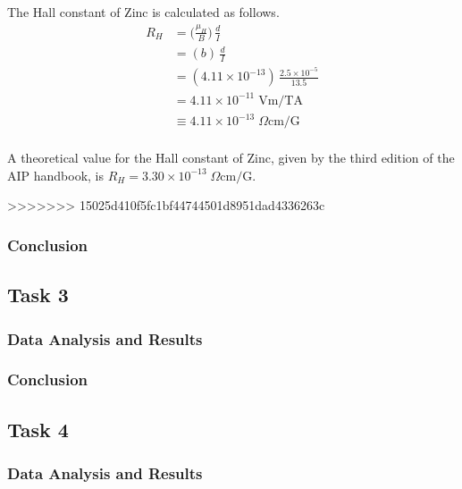 \documentclass[a4paper]{article}
\begin{document}
The Hall constant of Zinc is calculated as follows.
\begin{align*}
R_H &= \big( \frac{\mu_H}{B} \big) \, \frac{d}{I} \\
    &= (b) \, \frac{d}{I} \\
    &= (4.11 \times 10^{-13}) \, \frac{2.5 \times 10^{-5}}{13.5} \\
    &= 4.11 \times 10^{-11} \; \text{Vm/TA} \\
    &\equiv 4.11 \times 10^{-13} \; \Omega \text{cm/G} \\
\end{align*}

A theoretical value for the Hall constant of Zinc, given by the third edition of the AIP handbook, is $R_H = 3.30 \times 10^{-13} \; \Omega \text{cm/G}$.



>>>>>>> 15025d410f5fc1bf44744501d8951dad4336263c

\subsubsection{Conclusion}

\subsection{Task 3}

\subsubsection{Data Analysis and Results}

\subsubsection{Conclusion}

\subsection{Task 4}

\subsubsection{Data Analysis and Results}
\end{document}

